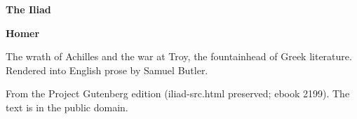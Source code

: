 \documentclass[11pt,letterpaper]{article}
\begin{document}
\color{ink}

\begin{titlepage}
\centering
\vspace*{4em}
{\LARGE\bfseries\color{heading} The Iliad\par}
\vspace{2em}
{\Large\bfseries\color{heading} Homer\par}
\vspace{2.5em}
{\itshape\color{subhead}\parbox{0.8\linewidth}{\centering The wrath of Achilles and the war at Troy, the fountainhead of Greek literature. Rendered into English prose by Samuel Butler.\par}}
\vfill
{\small From the Project Gutenberg edition (iliad-src.html preserved; ebook 2199). The text is in the public domain.\par}
\vspace{2em}
\end{titlepage}

\tableofcontents


\end{document}
